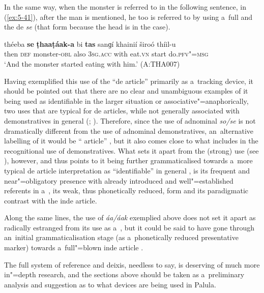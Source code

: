 In the same way, when the monster is referred to in the following sentence, in (\ref{ex:5-41}), after the man is mentioned, he too is referred to by using a~full  and the de \textit{se} (that form because the head is in the  case).
\begin{exe}
\ex
\label{ex:5-41}
\gll théeba \textbf{se} \textbf{ṭhaaṭáak-a} bi \textbf{tas} sanɡí khainií široó thíil-u\\
then \textsc{def} monster-\textsc{obl} also \textsc{3sg.acc} with eat.\textsc{vn} start do.\textsc{pfv"=msg}\\
\glt `And the monster started eating with him.' (A:THA007)
\end{exe}

Having exemplified this use of the ``de article'' primarily as a~tracking device, it should be pointed out that there are no clear and unambiguous examples of it being used as identifiable in the larger situation or associative"=anaphorically, two uses that are typical for de articles, while not generally associated with demonstratives in general (\citealt[485]{juvonen2006}; \citealt[233]{himmelmann1996}). Therefore, since the use of adnominal \textit{so/se} is not dramatically different from the  use of adnominal demonstratives, an~alternative labelling of it would be `` article'' \citep[486]{juvonen2006}, but it also comes close to what \citet[230--239]{himmelmann1996} includes in the recognitional use of demonstratives. What sets it apart from the (strong)  use (see ), however, and thus points to it being further grammaticalised towards a~more typical de article interpretation as ``identifiable'' in general \citep[485]{juvonen2006}, is its frequent and near"=obligatory presence with already introduced and well"=established referents in a~, its weak, thus phonetically reduced, form and its paradigmatic contrast with the inde article.


Along the same lines, the use of \textit{áa/áak} exemplied above does not set it apart as radically estranged from its use as a~, but it could be said to have gone through an~initial grammaticalisation stage (as a~phonetically reduced presentative marker) towards a~full"=blown inde article \citep[486]{juvonen2006}.



The full system of reference and deixis, needless to say, is deserving of much more in"=depth research, and the sections above should be taken as a~preliminary analysis and suggestion as to what devices are being used in Palula.



